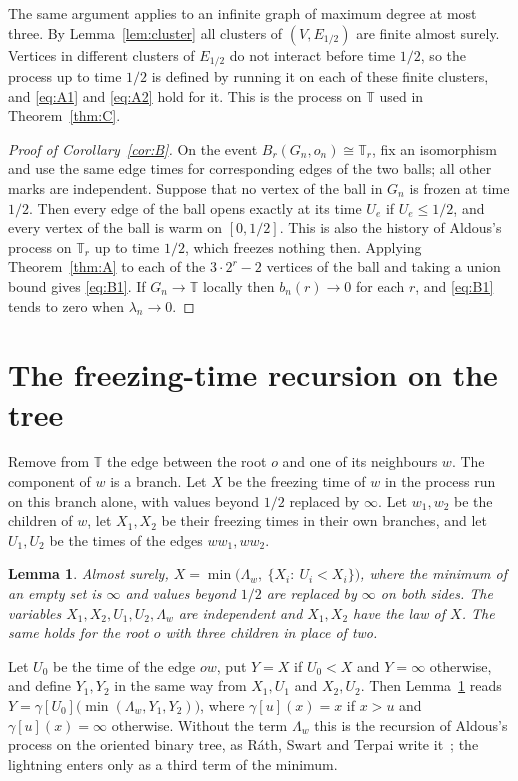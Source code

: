 \documentclass[11pt]{amsart}
\newtheorem{lemma}[theorem]{Lemma}
\theoremstyle{remark}
\numberwithin{equation}{section}
\newcommand{\T}{\mathbb{T}}
\begin{document}
The same argument applies to an infinite graph of maximum degree at most three.
By Lemma~\ref{lem:cluster} all clusters of $(V,E_{1/2})$ are finite
almost surely. Vertices in different clusters of $E_{1/2}$ do not
interact before time $1/2$, so the process up to time $1/2$ is defined by
running it on each of these finite clusters, and \eqref{eq:A1} and
\eqref{eq:A2} hold for it. This is the process on $\T$ used in
Theorem~\ref{thm:C}.

\begin{proof}[Proof of Corollary~\ref{cor:B}]
On the event $B_r(G_n,o_n)\cong\T_r$, fix an isomorphism and use the same
edge times for corresponding edges of the two balls; all other marks are
independent. Suppose that no vertex of the ball in $G_n$ is frozen at
time $1/2$. Then every edge of the ball opens exactly at its time $U_e$
if $U_e\le1/2$, and every vertex of the ball is warm on $[0,1/2]$. This
is also the history of Aldous's process on $\T_r$ up to time $1/2$, which
freezes nothing then. Applying Theorem~\ref{thm:A} to each of the
$3\cdot2^r-2$ vertices of the ball and taking a union bound gives
\eqref{eq:B1}. If $G_n\to\T$ locally then $b_n(r)\to0$ for each $r$, and
\eqref{eq:B1} tends to zero when $\lambda_n\to0$.
\end{proof}

\section{The freezing-time recursion on the tree}\label{sec:rec}

Remove from $\T$ the edge between the root $o$ and one of its neighbours
$w$. The component of $w$ is a branch. Let
$X$ be the freezing time of $w$ in the process run on this branch
alone, with values beyond $1/2$ replaced by $\infty$. Let $w_1,w_2$ be
the children of $w$, let $X_1,X_2$ be their freezing times in their
own branches, and let $U_1,U_2$ be the times of the edges $ww_1,ww_2$.

\begin{lemma}\label{lem:rec}
Almost surely, $X=\min\bigl(\Lambda_w,\ \{X_i:\ U_i<X_i\}\bigr)$, where
the minimum of an empty set is $\infty$ and values beyond $1/2$ are
replaced by $\infty$ on both sides. The variables $X_1,X_2,U_1,U_2,
\Lambda_w$ are independent and $X_1,X_2$ have the law of $X$. The same
holds for the root $o$ with three children in place of two.
\end{lemma}

Let $U_0$ be the time of the edge $ow$, put $Y=X$ if $U_0<X$ and
$Y=\infty$ otherwise, and define $Y_1,Y_2$ in the same way from
$X_1,U_1$ and $X_2,U_2$. Then Lemma~\ref{lem:rec} reads
$Y=\gamma[U_0]\bigl(\min(\Lambda_w,Y_1,Y_2)\bigr)$, where
$\gamma[u](x)=x$ if $x>u$ and $\gamma[u](x)=\infty$ otherwise. Without
the term $\Lambda_w$ this is the recursion of Aldous's process on the
oriented binary tree, as Ráth, Swart and Terpai write
it~\cite[Section~1.2]{RST21}; the lightning enters only as a third term
of the minimum.
\end{document}
